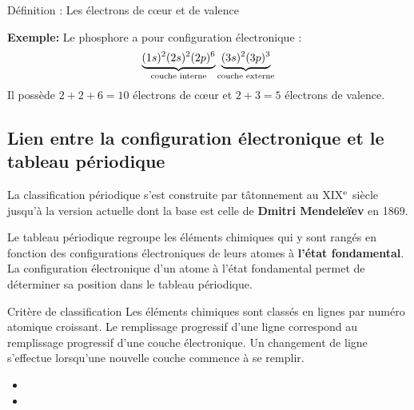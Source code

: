 \documentclass[french]{article}
\begin{document}
\begin{definition}{Définition : Les électrons de c\oe ur et de valence}
	\bigskip
	
	\dotfill \bigskip

	\dotfill \bigskip

	\dotfill

	
\end{definition}

\noindent \textbf{Exemple:} Le phosphore  a pour configuration électronique : \[\rm \underbrace{(1s)^2(2s)^2(2p)^6}_{\text{couche interne}}\underbrace{(3s)^2(3p)^3}_{\text{couche externe}}\] 
Il possède $2+2+6=10$ électrons de c\oe ur et $2+3=5$ électrons de valence.

\subsection{Lien entre la configuration électronique et  le tableau périodique}

La classification périodique s'est construite par tâtonnement au XIX$^{\rm e}$ siècle jusqu'à la version actuelle dont la base est celle de \textbf{Dmitri Mendeleïev} en 1869.\medskip


Le tableau périodique regroupe les éléments chimiques qui y sont rangés en fonction des configurations électroniques de leurs atomes à \textbf{l'état fondamental}. La configuration électronique d'un atome à l'état fondamental permet de déterminer sa position dans le tableau périodique.\bigskip

\begin{definition}{Critère de classification}
Les éléments chimiques sont classés en lignes par numéro atomique croissant. Le remplissage progressif d'une ligne correspond au remplissage progressif d'une couche électronique. Un changement de ligne s'effectue lorsqu'une nouvelle couche commence à se remplir.\bigskip

\begin{itemize}
	\item \dotfill \bigskip
	
\dotfill \bigskip
	
	\item \dotfill \bigskip
	
\dotfill \bigskip

\end{itemize}
\end{definition}\bigskip
\end{document}
